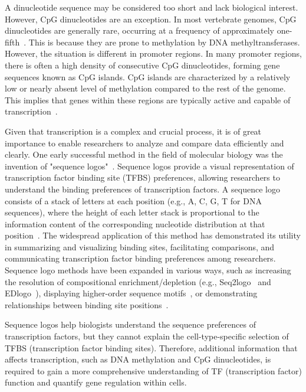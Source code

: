 \documentclass{PHlab-thesis}
\begin{document}
A dinucleotide sequence may be considered too short and lack biological interest. However, CpG dinucleotides are an exception. In most vertebrate genomes, CpG dinucleotides are generally rare, occurring at a frequency of approximately one-fifth~\cite{Saxonov2006}. This is because they are prone to methylation by DNA methyltransferases. However, the situation is different in promoter regions. In many promoter regions, there is often a high density of consecutive CpG dinucleotides, forming gene sequences known as CpG islands. CpG islands are characterized by a relatively low or nearly absent level of methylation compared to the rest of the genome. This implies that genes within these regions are typically active and capable of transcription~\cite{Deaton2011CpG}.

Given that transcription is a complex and crucial process, it is of great importance to enable researchers to analyze and compare data efficiently and clearly. One early successful method in the field of molecular biology was the invention of "sequence logos"~\cite{schneider1990sequence}. Sequence logos provide a visual representation of transcription factor binding site (TFBS) preferences, allowing researchers to understand the binding preferences of transcription factors. A sequence logo consists of a stack of letters at each position (e.g., {A, C, G, T} for DNA sequences), where the height of each letter stack is proportional to the information content of the corresponding nucleotide distribution at that position~\cite{schneider1990sequence}. The widespread application of this method has demonstrated its utility in summarizing and visualizing binding sites, facilitating comparisons, and communicating transcription factor binding preferences among researchers. Sequence logo methods have been expanded in various ways, such as increasing the resolution of compositional enrichment/depletion (e.g., Seq2logo~\cite{Seq2Logo10.1093/nar/gks469} and EDlogo~\cite{Dey2018sequencelogo}), displaying higher-order sequence motifs~\cite{10.1093/nar/gky497}, or demonstrating relationships between binding site positions~\cite{Siebert2016Bayesian}.

Sequence logos help biologists understand the sequence preferences of transcription factors, but they cannot explain the cell-type-specific selection of TFBS (transcription factor binding sites). Therefore, additional information that affects transcription, such as DNA methylation and CpG dinucleotides, is required to gain a more comprehensive understanding of TF (transcription factor) function and quantify gene regulation within cells. 
\end{document}
